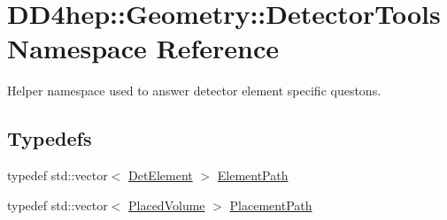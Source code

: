 \hypertarget{namespace_d_d4hep_1_1_geometry_1_1_detector_tools}{
\section{DD4hep::Geometry::DetectorTools Namespace Reference}
\label{namespace_d_d4hep_1_1_geometry_1_1_detector_tools}
}


Helper namespace used to answer detector element specific questons.  
\subsection*{Typedefs}
\begin{DoxyCompactItemize}
\item 
typedef std::vector$<$ \hyperlink{class_d_d4hep_1_1_geometry_1_1_det_element}{DetElement} $>$ \hyperlink{namespace_d_d4hep_1_1_geometry_1_1_detector_tools_a57c8f37a975258fd84676a69e74c56ab}{ElementPath}
\item 
typedef std::vector$<$ \hyperlink{class_d_d4hep_1_1_geometry_1_1_placed_volume}{PlacedVolume} $>$ \hyperlink{namespace_d_d4hep_1_1_geometry_1_1_detector_tools_a6cc33285199e04dd336a33e6e62925e6}{PlacementPath}
\end{DoxyCompactItemize}
